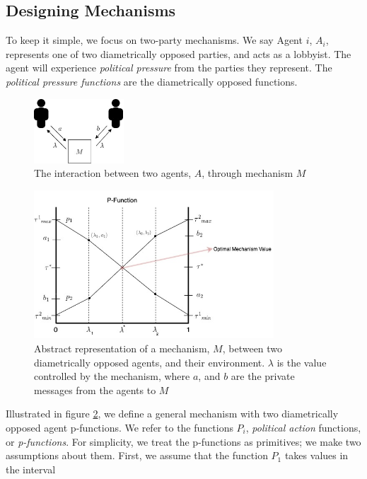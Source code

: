 \documentclass[10pt, titlepage, twocolumn]{report}
\begin{document}
\subsection{Designing Mechanisms}
\hspace*{15pt}
To keep it simple, we focus on two-party mechanisms. We say Agent \(i\), \(A_i\), represents one of two diametrically opposed parties, and acts as a lobbyist. The agent will experience \textit{political pressure} from the parties they represent. The \textit{political pressure functions} are the diametrically opposed functions.

\begin{figure}[ht]
\centering
	\includegraphics[width=0.3\textwidth]{mechanisms_simple}
	\caption{The interaction between two agents, \(A\), through mechanism \(M\)}
	\label{mechanisms_simple}
\end{figure}

\begin{figure}[ht]
\centering
	\includegraphics[width=0.8\textwidth]{mechanisms_general}
	\caption{Abstract representation of a mechanism, \(M\), between two diametrically opposed agents, and their environment. \(\lambda\) is the value controlled by the mechanism, where \(a\), and \(b\) are the private messages from the agents to \(M\)}
	\label{mechanisms_general}
\end{figure}

\hspace*{15pt}
Illustrated in figure \ref{mechanisms_general}, we define a general mechanism with two diametrically opposed agent p-functions. We refer to the functions \(P_i\), \textit{political action} functions, or \textit{p-functions}. For simplicity, we treat the p-functions as primitives; we make two assumptions about them. First, we assume that the function \(P_1\) takes values in the interval \cite{DEM}
\end{document}
